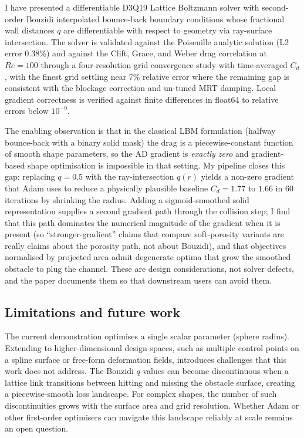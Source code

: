 \documentclass[10pt,twocolumn]{article}
\begin{document}
I have presented a differentiable D3Q19 Lattice Boltzmann solver
with second-order Bouzidi interpolated bounce-back boundary
conditions whose fractional wall distances $q$ are differentiable
with respect to geometry via ray-surface intersection. The solver is
validated against the Poiseuille analytic solution (L2 error
$0.38$\%) and against the Clift, Grace, and Weber drag correlation
at $Re = 100$ through a four-resolution grid convergence study with
time-averaged $C_d$, with the finest grid settling near 7\% relative
error where the remaining gap is consistent with the blockage
correction and un-tuned MRT damping. Local gradient correctness is
verified against finite differences in float64 to relative errors
below $10^{-9}$.

The enabling observation is that in the classical LBM formulation
(halfway bounce-back with a binary solid mask) the drag is a
piecewise-constant function of smooth shape parameters, so the AD
gradient is \emph{exactly zero} and gradient-based shape optimisation
is impossible in that setting. My pipeline closes this gap:
replacing $q = 0.5$ with the ray-intersection $q(r)$ yields a
non-zero gradient that Adam uses to reduce a physically plausible
baseline $C_d = 1.77$ to $1.66$ in 60 iterations by shrinking the
radius. Adding a sigmoid-smoothed solid representation supplies a
second gradient path through the collision step; I find that this
path dominates the numerical magnitude of the gradient when it is
present (so ``stronger-gradient'' claims that compare soft-porosity
variants are really claims about the porosity path, not about
Bouzidi), and that objectives normalised by projected area admit
degenerate optima that grow the smoothed obstacle to plug the
channel. These are design considerations, not solver defects, and
the paper documents them so that downstream users can avoid them.

\subsection*{Limitations and future work}

The current demonstration optimises a single scalar parameter (sphere
radius). Extending to higher-dimensional design spaces, such as
multiple control points on a spline surface or free-form deformation
fields, introduces challenges that this work does not address. The Bouzidi $q$
values can become discontinuous when a lattice link transitions between
hitting and missing the obstacle surface, creating a piecewise-smooth
loss landscape. For complex shapes, the number of such discontinuities
grows with the surface area and grid resolution. Whether Adam or other
first-order optimisers can navigate this landscape reliably at scale
remains an open question.
\end{document}
